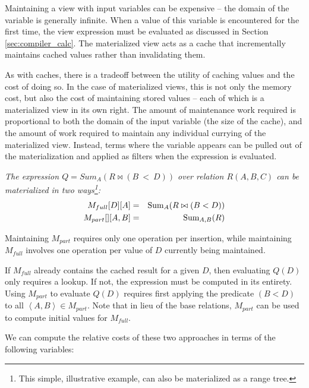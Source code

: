 Maintaining a view with input variables can be expensive -- the domain of the variable is generally infinite.  When a value of this variable is encountered for the first time, the view expression must be evaluated as discussed in Section \ref{sec:compiler_calc}.  The materialized view acts as a cache that incrementally maintains cached values rather than invalidating them.

As with caches, there is a tradeoff between the utility of caching values and the cost of doing so.  In the case of materialized views, this is not only the memory cost, but also the cost of maintaining stored values -- each of which is a materialized view in its own right.  The amount of maintenance work required is proportional to both the domain of the input variable (the size of the cache), and the amount of work required to maintain any individual currying of the materialized view.  Instead, terms where the variable appears can be pulled out of the materialization and applied as filters when the expression is evaluated.

\begin{example} \em
The expression $Q = Sum_A(R \bowtie (B~<~D))$ over relation $R(A,B,C)$ can be materialized in two ways\footnote{This simple, illustrative example, can also be materialized as a range tree.}:
{\small \begin{eqnarray*}
M_{full}[D][A] & = & \mbox{Sum}_A(R \bowtie (B < D)) \\
M_{part}[][A,B] & = & \mbox{Sum}_{A,B}(R)
\end{eqnarray*}}
\end{example}

Maintaining $M_{part}$ requires only one operation per insertion, while maintaining $M_{full}$ involves one operation per value of $D$ currently being maintained.  

  If $M_{full}$ already contains the cached result for a given $D$, then evaluating $Q(D)$ only requires a lookup.  If not, the expression must be computed in its entirety.  Using $M_{part}$ to evaluate $Q(D)$ requires first applying the predicate $(B < D)$ to all $\left<A,B\right> \in M_{part}$.  Note that in lieu of the base relations, $M_{part}$ can be used to compute initial values for $M_{full}$.

We can compute the relative costs of these two approaches in terms of the following variables:

